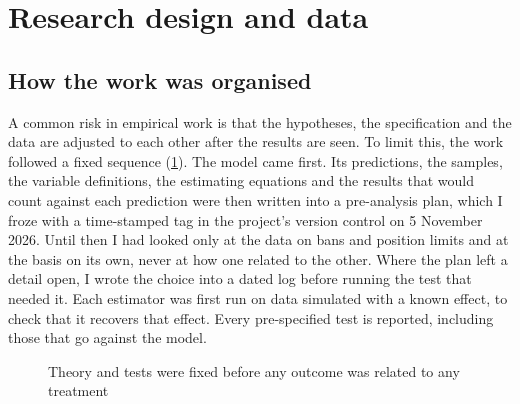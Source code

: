 \section{Research design and data}\label{sec:data}

\subsection{How the work was organised}
A common risk in empirical work is that the hypotheses, the specification and the data are adjusted to each other after
the results are seen. To limit this, the work followed a fixed sequence (\cref{fig:design}). The model came first. Its
predictions, the samples, the variable definitions, the estimating equations and the results that would count against
each prediction were then written into a pre-analysis plan, which I froze with a time-stamped tag in the project's
version control on 5 November 2026. Until then I had looked only at the data on bans and position limits and at the
basis on its own, never at how one related to the other. Where the plan left a detail open, I wrote the choice into a
dated log before running the test that needed it. Each estimator was first run on data simulated with a known effect, to
check that it recovers that effect. Every pre-specified test is reported, including those that go against the model.

\begin{figure}[t]
\caption{Theory and tests were fixed before any outcome was related to any treatment}\label{fig:design}
\centering
{}
\end{figure}

